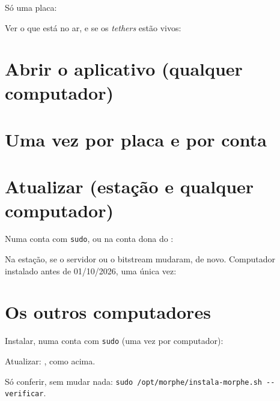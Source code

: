 
Só uma placa:


Ver o que está no ar, e se os \emph{tethers} estão vivos:


\section*{Abrir o aplicativo (qualquer computador)}


\section*{Uma vez por placa e por conta}


\section*{Atualizar (estação e qualquer computador)}

Numa conta com \texttt{sudo}, ou na conta dona do :


\noindent Na estação, se o servidor ou o bitstream mudaram,
  de novo. Computador instalado antes de
01/10/2026, uma única vez:


\section*{Os outros computadores}

Instalar, numa conta com \texttt{sudo} (uma vez por computador):


Atualizar: , como acima.

\noindent Só conferir, sem mudar nada: \texttt{sudo /opt/morphe/instala-morphe.sh -{}-verificar}.

